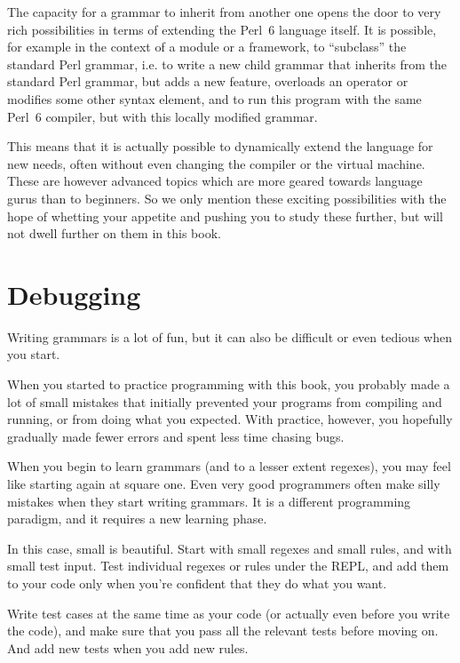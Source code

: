The capacity for a grammar to inherit from another one opens 
the door to very rich possibilities in terms of 
extending the Perl~6 language itself. It is possible, for 
example in the context of a module or a framework, to ``subclass'' 
the standard Perl grammar, i.e. to write a new child grammar that 
inherits from the standard Perl grammar, but adds a new 
feature, overloads an operator or modifies some other syntax 
element, and to run this program with the same Perl~6 compiler,
but with this locally modified grammar.

This means that it is actually possible to dynamically extend 
the language for new needs, often without even changing the compiler 
or the virtual machine. These are however advanced topics which 
are more geared towards language gurus than to beginners. So 
we only mention these exciting possibilities with the hope of 
whetting your appetite and pushing you to study these further, 
but will not dwell further on them in this book.

\section{Debugging}

Writing grammars is a lot of fun, but it can also be difficult 
or even tedious when you start.

When you started to practice programming with this book, you probably 
made a lot of small mistakes that initially prevented your 
programs from compiling and running, or from doing what 
you expected. With practice, however, you hopefully gradually 
made fewer errors and spent less time chasing bugs.

When you begin to learn grammars (and to a lesser extent regexes), 
you may feel like starting again at square one. Even 
very good programmers often make silly mistakes when they start 
writing grammars. It is a different programming paradigm, and 
it requires a new learning phase.

In this case, small is beautiful. Start with small regexes and 
small rules, and with small test input. Test individual regexes 
or rules under the REPL, and add them to your code only when 
you're confident that they do what you want.

Write test cases at the same time as your code (or actually even 
before you write the code), and make sure that you pass all the 
relevant tests before moving on. And add new tests when you add 
new rules.

